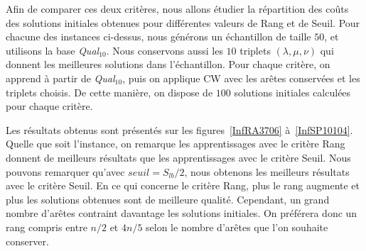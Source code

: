 \documentclass[a4paper,11pt]{article}%
\begin{document}
Afin de comparer ces deux critères, nous allons étudier la répartition des coûts des solutions initiales obtenues pour différentes valeurs de Rang et de Seuil.  
Pour chacune des instances ci-dessus, nous générons un échantillon de taille $50$, et utilisons la base \emph{Qual$_{10}$}. Nous conservons aussi les $10$ triplets $(\lambda,\mu,\nu)$ qui donnent les meilleures solutions dans l'échantillon. 
Pour chaque critère, on apprend à partir de \emph{Qual$_{10}$}, puis on applique CW avec les arêtes conservées et les triplets choisis.
De cette manière, on dispose de $100$ solutions initiales calculées pour chaque critère.

Les résultats obtenus sont présentés sur les figures~\ref{InfRA3706} à~\ref{InfSP10104}.
Quelle que soit l'instance, on remarque les apprentissages avec le critère Rang donnent de meilleurs résultats que les apprentissages avec le critère Seuil.
Nous pouvons remarquer qu'avec $ seuil = S_{lb}/2$, nous obtenons les meilleurs résultats avec le critère Seuil.
En ce qui concerne le critère Rang, plus le rang augmente et plus les solutions obtenues sont de meilleure qualité. Cependant, un grand nombre d'arêtes contraint davantage les solutions initiales. On préférera donc un rang compris entre $n/2$ et $4n/5$ selon le nombre d'arêtes que l'on souhaite conserver. 
\end{document}
